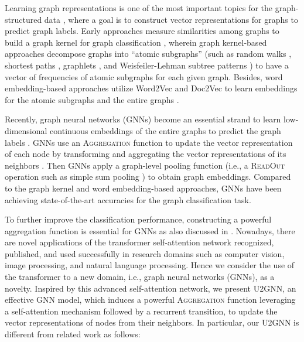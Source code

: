 \documentclass[twoside,leqno,twocolumn]{article}
\newcommand{\citep}{\cite}
\begin{document}
Learning graph representations is one of the most important topics for the graph-structured data \citep{hamilton2017representation,zhou2018graph,wu2019comprehensive,zhang2020network}, where a goal is to construct vector representations for graphs to predict graph labels.
Early approaches measure similarities among graphs to build a graph kernel for graph classification \citep{gartner2003graph}, wherein graph kernel-based approaches decompose graphs into ``atomic subgraphs'' (such as random walks \citep{gartner2003graph,kashima2003marginalized,vishwanathan2010graph}, shortest paths \citep{Borgwardt2005}, graphlets \citep{shervashidze2009efficient}, and Weisfeiler-Lehman subtree patterns \citep{shervashidze2011weisfeiler}) to have a vector of frequencies of atomic subgraphs for each given graph.
Besides, word embedding-based approaches utilize Word2Vec \citep{MikolovSCCD13nips} and Doc2Vec \citep{le:2014} to learn embeddings for the atomic subgraphs \citep{yanardag2015deep} and the entire graphs \citep{narayanan2017graph2vec,ivanov2018anonymous}.


Recently, graph neural networks (GNNs) become an essential strand to learn low-dimensional continuous embeddings of the entire graphs to predict the graph labels \citep{scarselli2009graph,hamilton2017representation,zhou2018graph,wu2019comprehensive,zhang2020network}.
GNNs use an \textsc{Aggregation} function to update the vector representation of each node by transforming and aggregating the vector representations of its neighbors \citep{kipf2017semi,hamilton2017inductive,velickovic2018graph}.
Then GNNs apply a graph-level pooling function (i.e., a \textsc{ReadOut} operation such as simple sum pooling \citep{xu2019powerful}) to obtain graph embeddings.
Compared to the graph kernel and word embedding-based approaches, GNNs have been achieving state-of-the-art accuracies for the graph classification task. 

To further improve the classification performance, constructing a powerful aggregation function is essential for GNNs as also discussed in \citep{xu2019powerful}.
Nowadays, there are novel applications of the transformer self-attention network \citep{vaswani2017attention,dehghani2018universal} recognized, published, and used successfully in research domains such as computer vision, image processing, and natural language processing.
Hence we consider the use of the transformer to a new domain, i.e., graph neural networks (GNNs), as a novelty.
Inspired by this advanced self-attention network, we present U2GNN, an effective GNN model, which induces a powerful \textsc{Aggregation} function leveraging a self-attention mechanism \citep{vaswani2017attention} followed by a recurrent transition, to update the vector representations of nodes from their neighbors.
In particular, our U2GNN is different from related work as follows:
\end{document}
